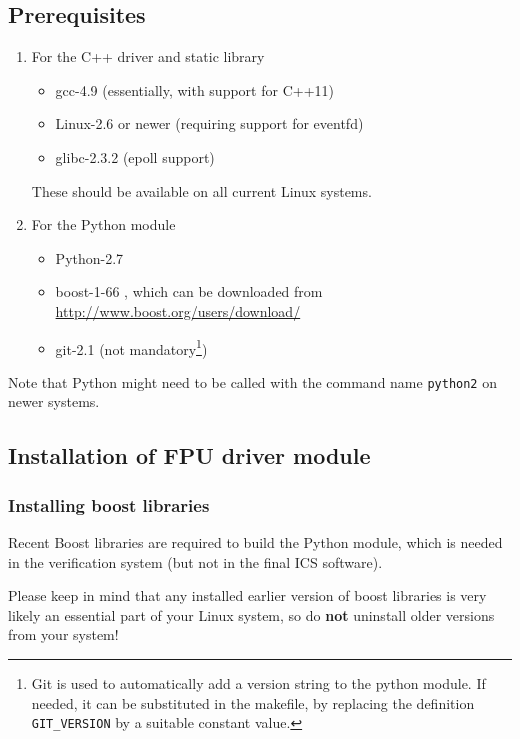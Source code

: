 \documentclass[11pt,a4paper]{report}
\begin{document}
\subsection{Prerequisites}

\begin{enumerate}
  \item For the C++ driver and static library

    
\begin{itemize}
\item gcc-4.9 (essentially, with support for C++11)
\item Linux-2.6 or newer (requiring support for eventfd)
\item glibc-2.3.2 (epoll support)
\end{itemize}

These should be available on all current Linux systems.

\item For the Python module

\begin{itemize}
\item Python-2.7
\item boost-1-66 , which can be downloaded from \url{http://www.boost.org/users/download/}
\item git-2.1 (not mandatory\footnote{Git is used to automatically add a version
  string to the python module. If needed, it can be substituted in the
  makefile, by replacing the definition \texttt{GIT\_VERSION} by a
  suitable constant value.})
\end{itemize}
\end{enumerate}


Note that Python might need to be called with the command name
\texttt{python2} on newer systems.

\subsection{Installation of FPU driver module}
\subsubsection{Installing boost libraries}
Recent Boost libraries are required to build the Python module, which
is needed in the verification system (but not in the final ICS
software).

Please keep in mind that any installed earlier version of boost
libraries is very likely an essential part of your Linux system, so do
\textbf{not} uninstall older versions from your system!
\end{document}
